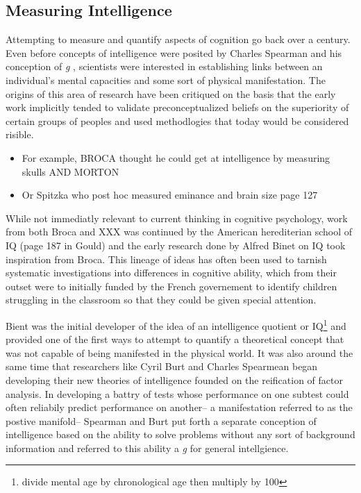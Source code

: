 \documentclass[]{book}
\providecommand{\tightlist}{%
  \setlength{\itemsep}{0pt}\setlength{\parskip}{0pt}}
\let\rmarkdownfootnote\footnote%
\def\footnote{\protect\rmarkdownfootnote}
\begin{document}
\hypertarget{measuring-intelligence}{%
\subsection{Measuring Intelligence}\label{measuring-intelligence}}

Attempting to measure and quantify aspects of cognition go back over a century.
Even before concepts of intelligence were posited by Charles Spearman and his conception of \emph{g} \citep{spearmanGeneralIntelligenceObjectively1904}, scientists were interested in establishing links between an individual's mental capacities and some sort of physical manifestation.
The origins of this area of research have been critiqued on the basis that the early work implicitly tended to validate preconceptualized beliefs on the superiority of certain groups of peoples and used methodlogies that today would be considered risible.

\begin{itemize}
\tightlist
\item
  For example, BROCA thought he could get at intelligence by measuring skulls AND MORTON
\item
  Or Spitzka who post hoc measured eminance and brain size page 127
\end{itemize}

While not immediatly relevant to current thinking in cognitive psychology, work from both Broca and XXX was continued by the American herediterian school of IQ (page 187 in Gould) and the early research done by Alfred Binet on IQ took inspiration from Broca.
This lineage of ideas has often been used to tarnish systematic investigations into differences in cognitive ability, which from their outset were to initially funded by the French governement to identify children struggling in the classroom so that they could be given special attention.

Bient was the initial developer of the idea of an intelligence quotient or IQ\footnote{divide mental age by chronological age then multiply by 100} and provided one of the first ways to attempt to quantify a theoretical concept that was not capable of being manifested in the physical world.
It was also around the same time that researchers like Cyril Burt and Charles Spearmean began developing their new theories of intelligence founded on the reification of factor analysis.
In developing a battry of tests whose performance on one subtest could often reliabily predict performance on another-- a manifestation referred to as the postive manifold-- Spearman and Burt put forth a separate conception of intelligence based on the ability to solve problems without any sort of background information and referred to this ability a \emph{g} for general intellgience.
\end{document}
